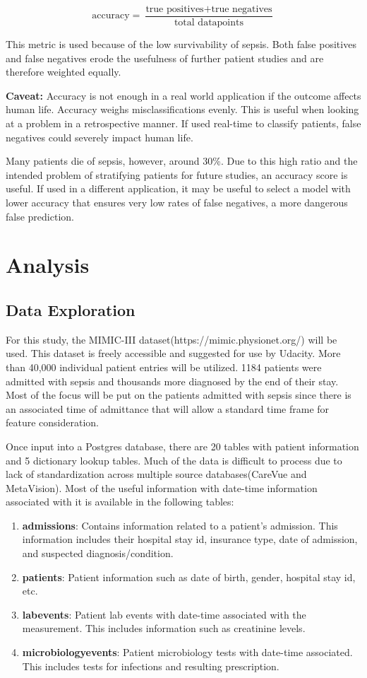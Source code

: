 \documentclass[11pt]{article}
\begin{document}
	\[ \text{accuracy} = \frac{\text{true positives} + \text{true negatives}} {\text{total datapoints}} \]
	
	
	
	This metric is used because of the low survivability of sepsis. Both false positives and false negatives erode the usefulness of further patient studies and are therefore weighted equally.
	
	\textbf{Caveat:} Accuracy is not enough in a real world application if the outcome affects human life. Accuracy weighs misclassifications evenly. This is useful when looking at a problem in a retrospective manner. If used real-time to classify patients, false negatives could severely impact human life.
	
	Many patients die of sepsis, however, around 30\%. Due to this high ratio and the intended problem of stratifying patients for future studies, an accuracy score is useful. If used in a different application, it may be useful to select a model with lower accuracy that ensures very low rates of false negatives, a more dangerous false prediction.
	
	\section{Analysis}
	\subsection{Data Exploration}
	For this study, the MIMIC-III dataset(https://mimic.physionet.org/) will be used. This dataset is freely accessible and suggested for use by Udacity. More than 40,000 individual patient entries will be utilized. 1184 patients were admitted with sepsis and thousands more diagnosed by the end of their stay. Most of the focus will be put on the patients admitted with sepsis since there is an associated time of admittance that will allow a standard time frame for feature consideration.
	
	Once input into a Postgres database, there are 20 tables with patient information and 5 dictionary lookup tables. Much of the data is difficult to process due to lack of standardization across multiple source databases(CareVue and MetaVision). Most of the useful information with date-time information associated with it is available in the following tables:
	
	\begin{enumerate}
		\item \textbf{admissions}: Contains information related to a patient's admission. This information includes their hospital stay id, insurance type, date of admission, and suspected diagnosis/condition.
		\item \textbf{patients}: Patient information such as date of birth, gender, hospital stay id, etc. 
		\item \textbf{labevents}: Patient lab events with date-time associated with the measurement. This includes information such as creatinine levels.
		\item \textbf{microbiologyevents}: Patient microbiology tests with date-time associated. This includes tests for infections and resulting prescription.
	\end{enumerate}
	
\end{document}
